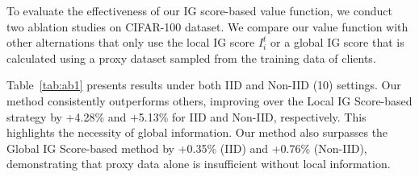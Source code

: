 \documentclass[sigconf]{acmart}
\begin{document}
\begin{table}[t]
  \centering
    \caption{The impact the number of total clients. Experiments are conducted on CIFAR-100 with Non-IID (10) settings. Accuracies are reported.}
  \label{tab:sens-num-clients}%
\end{table}%

To evaluate the effectiveness of our IG score-based value function, we conduct two ablation studies on CIFAR-100 dataset. We compare our value function with other alternations that only use the local IG score $I_i^t$ or a global IG score that is calculated using a proxy dataset sampled from the training data of clients. 

Table~\ref{tab:ab1} presents results under both IID and Non-IID (10) settings. Our method consistently outperforms others, improving over the Local IG Score-based strategy by +4.28\% and +5.13\% for IID and Non-IID, respectively. This highlights the necessity of global information. Our method also surpasses the Global IG Score-based method by +0.35\% (IID) and +0.76\% (Non-IID), demonstrating that proxy data alone is insufficient without local information.

\end{document}
